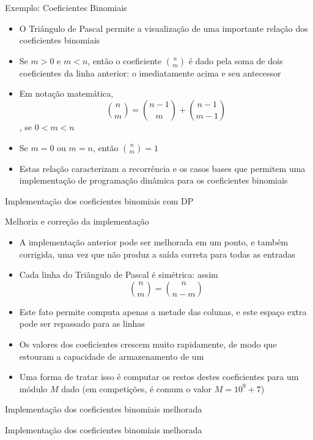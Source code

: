 \begin{frame}[fragile]{Exemplo: Coeficientes Binomiais}

    \begin{itemize}
        \item O Triângulo de Pascal permite a visualização de uma importante relação dos
            coeficientes binomiais

        \item Se $m > 0$ e $m < n$, então o coeficiente $\binom{n}{m}$ é dado pela soma de
            dois coeficientes da linha anterior: o imediatamente acima e seu antecessor

        \item Em notação matemática,
        \[
            \binom{n}{m} = \binom{n - 1}{m} + \binom{n - 1}{m - 1}
        \], se $0 < m < n$

        \item Se $m = 0$ ou $m = n$, então $\binom{n}{m} = 1$

        \item Estas relação caracterizam a recorrência e os casos bases que permitem uma
            implementação de programação dinâmica para os coeficientes binomiais
    \end{itemize}

\end{frame}

\begin{frame}[fragile]{Implementação dos coeficientes binomiais com DP}
\end{frame}

\begin{frame}[fragile]{Melhoria e correção da implementação}

    \begin{itemize}
        \item A implementação anterior pode ser melhorada em um ponto, e também corrigida,
            uma vez que não produz a saída correta para todas as entradas

        \item Cada linha do Triângulo de Pascal é simétrica: assim
        \[
            \binom{n}{m} = \binom{n}{n - m}
        \]

        \item Este fato permite computa apenas a metade das colunas, e este espaço extra pode
            ser repassado para as linhas

        \item Os valores dos coeficientes crescem muito rapidamente, de modo que estouram a
            capacidade de armazenamento de um 

        \item Uma forma de tratar isso é computar os restos destes coeficientes para um módulo
            $M$ dado (em competições, é comum o valor $M = 10^9 + 7$)
    \end{itemize}

\end{frame}

\begin{frame}[fragile]{Implementação dos coeficientes binomiais melhorada}
\end{frame}

\begin{frame}[fragile]{Implementação dos coeficientes binomiais melhorada}
\end{frame}
